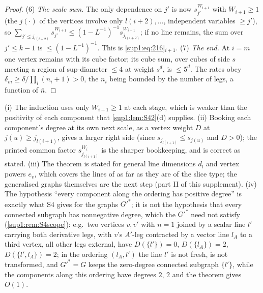 \begin{proof}
(6) \emph{The scale sum.} The only dependence on $j'$ is now $s_{j'}^{W_{i+1}}$ with $W_{i+1}\ge1$ (the $j(\cdot)$ of the vertices involve only $l(i+2),\dots$, independent variables $\ge j'$), so $\sum_{j'\le j_{l(i+2)}}s_{j'}^{W_{i+1}}\le(1-L^{-1})^{-1}s_{j_{l(i+2)}}^{W_{i+1}}$; if no line remains, the sum over $j'\le k-1$ is $\le(1-L^{-1})^{-1}$. This is \eqref{sup1:eq:216}$_{i+1}$.
(7) \emph{The end.} At $i=m$ one vertex remains with its cube factor; its cube sum, over cubes of side $s$ meeting a region of sup-diameter $\le4$ at weight $s^d$, is $\le5^d$. The rates obey $\delta_m\ge\delta/\prod_i(n_i+1)>0$, the $n_i$ being bounded by the number of legs, a function of $\bar n$.
\end{proof}

\begin{remark}\label{sup1:rem:S5}
(i) The induction uses only $W_{i+1}\ge1$ at each stage, which is weaker than the positivity of each component that \cref{sup1:lem:S42}(d) supplies. (ii) Booking each component's degree at its own next scale, as a vertex weight $D$ at $j(u)\ge j_{l(i+1)}$, gives a larger right side (since $s_{j_{l(i+1)}}\le s_{j(u)}$ and $D>0$); the printed common factor $s_{j_{l(i+1)}}^{W_i}$ is the sharper bookkeeping, and \cite[(2.16)]{Ba3} is correct as stated. (iii) The theorem is stated for general line dimensions $d_l$ and vertex powers $e_v$, which covers the lines of \cite[Prop.~2.2]{Ba3} as far as they are of the slice type; the generalised graphs themselves are the next step (part II of this supplement). (iv) The hypothesis ``every component along the ordering has positive degree'' is exactly what S4 gives for the graphs $G'^*$; it is not the hypothesis that every connected subgraph has nonnegative degree, which the $G'^*$ need not satisfy (\cref{sup1:rem:S4scope}): e.g.\ two \cite[(1.8)]{Ba3} vertices $v,v'$ with $n=1$ joined by a scalar line $l'$ carrying both derivative legs, with $v$'s $A'$-leg contracted by a vector line $l_A$ to a third \cite[(1.8)]{Ba3} vertex, all other legs external, have $D(\{l'\})=0$, $D(\{l_A\})=2$, $D(\{l',l_A\})=2$; in the ordering $(l_A,l')$ the line $l'$ is not fresh, is not transformed, and $G'^*=G$ keeps the zero-degree connected subgraph $\{l'\}$, while the components along this ordering have degrees $2$, $2$ and the theorem gives $O(1)$.
\end{remark}
